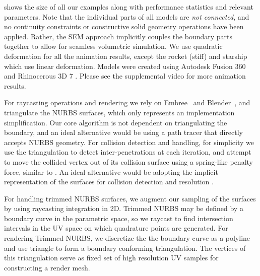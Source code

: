  shows the size of all our examples along with performance statistics and relevant parameters.
Note that the individual parts of all models are \emph{not connected}, and no continuity constraints or constructive solid geometry operations have been applied. 
Rather, the SEM approach implicitly couples the boundary parts together to allow for seamless volumetric simulation. 
We use quadratic deformation for all the animation results, except the rocket (stiff) and starship which use linear deformation.
Models were created using Autodesk Fusion 360 \cite{AutodeskFusion360} and Rhinocerous 3D 7 \cite{mcneel-rhinoceros}. 
Please see the supplemental video for more animation results.
  
For raycasting operations and rendering we rely on Embree~\cite{10.1145/2601097.2601199} and Blender~\cite{blender}, and triangulate the NURBS surfaces, which only represents an implementation simplification. 
Our core algorithm is not dependent on triangulating the boundary, and an ideal alternative would be using a path tracer that directly accepts NURBS geometry.
For collision detection and handling, for simplicity we use the triangulation to detect inter-penetrations at each iteration, and attempt to move the collided vertex out of its collision surface using a spring-like penalty force, similar to \cite{10.1145/3355089.3356486, 10.1145/2010324.1964932}.
An ideal alternative would be adopting the implicit representation of the surfaces for collision detection and resolution \cite{10.1145/1516522.1516523, 10.1145/3306346.3323010}. 

For handling trimmed NURBS surfaces, we augment our sampling of the surfaces by using raycasting integration in 2D. Trimmed NURBS may be defined by a boundary curve in the parametric space, so we raycast to find intersection intervals in the UV space on which quadrature points are generated. For rendering Trimmed NURBS, we discretize the the boundary curve as a polyline and use triangle \cite{shewchuk96b, SHEWCHUK200221} to form a boundary conforming triangulation. The vertices of this triangulation serve as fixed set of high resolution UV samples for constructing a render mesh.

